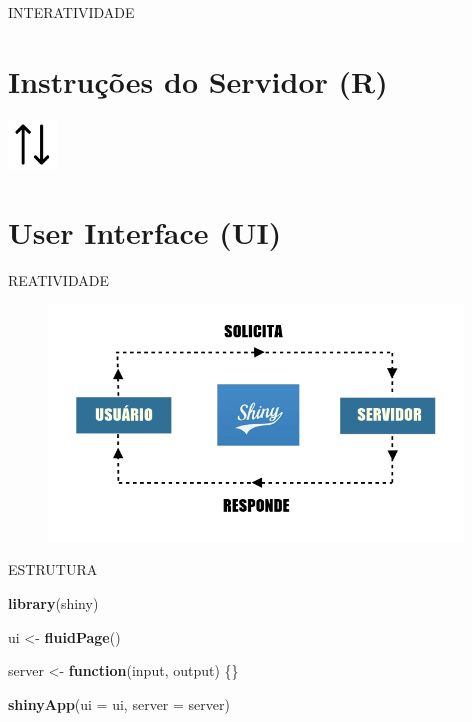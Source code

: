 \documentclass[
  ignorenonframetext,
]{beamer}
\newenvironment{Shaded}{\begin{snugshade}}{\end{snugshade}}
\newcommand{\ControlFlowTok}[1]{\textcolor[rgb]{0.13,0.29,0.53}{\textbf{#1}}}
\newcommand{\DataTypeTok}[1]{\textcolor[rgb]{0.13,0.29,0.53}{#1}}
\newcommand{\KeywordTok}[1]{\textcolor[rgb]{0.13,0.29,0.53}{\textbf{#1}}}
\newcommand{\NormalTok}[1]{#1}
\newcommand{\StringTok}[1]{\textcolor[rgb]{0.31,0.60,0.02}{#1}}
\begin{document}
\begin{frame}{INTERATIVIDADE}
\protect\hypertarget{interatividade}{}

\section{Instruções do Servidor (R)}
\begin{center}
\includegraphics[width=13mm]{imagens/trade}
\end{center}
\section{User Interface (UI)}

\end{frame}

\begin{frame}{REATIVIDADE}
\protect\hypertarget{reatividade}{}

\begin{figure}
\includegraphics[width=110mm]{imagens/cxv}
\end{figure}

\end{frame}

\begin{frame}[fragile]{ESTRUTURA}
\protect\hypertarget{estrutura}{}

\begin{Shaded}
\begin{Highlighting}[]
\KeywordTok{library}\NormalTok{(shiny)}

\NormalTok{ui <-}\StringTok{ }\KeywordTok{fluidPage}\NormalTok{()}

\NormalTok{server <-}\StringTok{ }\ControlFlowTok{function}\NormalTok{(input, output) \{\}}

\KeywordTok{shinyApp}\NormalTok{(}\DataTypeTok{ui =}\NormalTok{ ui, }\DataTypeTok{server =}\NormalTok{ server)}
\end{Highlighting}
\end{Shaded}

\end{frame}
\end{document}
